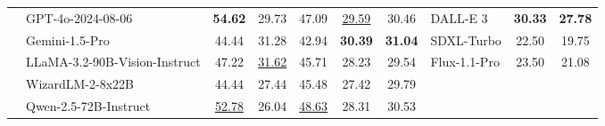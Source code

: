 \begin{table*}[h!]
{\begin{tabular}{llccccc|lcc}
        & GPT-4o-2024-08-06 & \textbf{54.62} & 29.73 & 47.09 & \underline{29.59} & 30.46 & DALL-E 3 & \textbf{30.33} & \textbf{27.78} \\
        & Gemini-1.5-Pro & 44.44 & 31.28 & 42.94 & \textbf{30.39} & \textbf{31.04} & SDXL-Turbo & 22.50 & 19.75 \\
        & LLaMA-3.2-90B-Vision-Instruct & 47.22 & \underline{31.62} & 45.71 & 28.23 & 29.54 & Flux-1.1-Pro & 23.50 & 21.08 \\
        & WizardLM-2-8x22B & 44.44 & 27.44 & 45.48 & 27.42 & 29.79 \\
        & Qwen-2.5-72B-Instruct & \underline{52.78} & 26.04 & \underline{48.63} & 28.31 & 30.53 \\
        \bottomrule
    \end{tabular}
    }
\end{table*}

